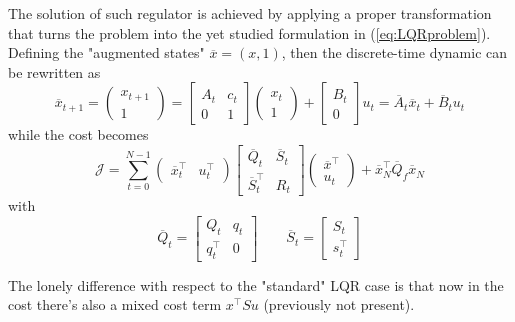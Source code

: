	The solution of such regulator is achieved by applying a proper transformation that turns the problem into the yet studied formulation in (\ref{eq:LQRproblem}). Defining the "augmented states" $\overline x = (x, 1)$, then the discrete-time dynamic can be rewritten as
	\[ \overline x_{t+1} = \begin{pmatrix}
		x_{t+1} \\ 1 
	\end{pmatrix} = \begin{bmatrix}
		A_t & c_t \\ 0 & 1
	\end{bmatrix} \begin{pmatrix}
		x_t \\ 1
	\end{pmatrix} + \begin{bmatrix}
		B_t \\ 0
	\end{bmatrix} u_t = \overline A_t \overline x_t + \overline B_t u_t\]
	while the cost becomes
	\[ \mathcal J = \sum_{t=0}^{N-1} \begin{pmatrix}
		\overline x_t^\top & u_t^\top 
	\end{pmatrix} \begin{bmatrix}
		\overline Q_t & \overline S_t \\ \overline S_t^\top & R_t
	\end{bmatrix} \begin{pmatrix}
		\overline x^\top \\ u_t
	\end{pmatrix}
	+ \overline x_N^\top \overline Q_f \overline x_N \]
	with
	\[ \overline Q_t = \begin{bmatrix}
		Q_t & q_t \\ q_t^\top & 0
	\end{bmatrix} \qquad \overline S_t = \begin{bmatrix}
		S_t \\ s_t^\top
	\end{bmatrix} \]
	
	The lonely difference with respect to the "standard" LQR case is that now in the cost there's also a mixed cost term $x^\top S u$ (previously not present).
	
